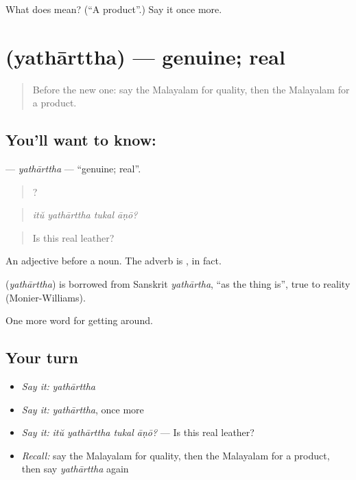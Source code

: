 \begin{tcolorbox}[breakable,colback=teal!4,colframe=teal!35!black,title={Before you move on}]
What does  mean? (\textquotedblleft{}A product\textquotedblright{}.) Say it once more.
\end{tcolorbox}
\section[\texorpdfstring{\ml{യഥാർത്ഥ} (yathārttha)}{യഥാർത്ഥ (yathārttha)}]{ (yathārttha) — genuine; real}

\label{lesson:ML-C492-yatharttha}



\begin{quote}
Before the new one: say the Malayalam for quality, then the Malayalam for a product.
\end{quote}

\subsection*{You'll want to know: }
\textbf{} — \emph{yathārttha} — \textquotedblleft{}genuine; real\textquotedblright{}.

\begin{quote}
   ?
\end{quote}

\begin{quote}
\emph{itŭ yathārttha tukal āṇō?}
\end{quote}

\begin{quote}
Is this real leather?
\end{quote}

An adjective before a noun. The adverb is , in fact.

\begin{cousinweb}
\textbf{} (\emph{yathārttha}) is borrowed from Sanskrit \emph{yathārtha}, \textquotedblleft{}as the thing is\textquotedblright{}, true to reality (Monier-Williams).
\end{cousinweb}

\begin{grammarlens}[title={What you've built}]
One more word for getting around.
\end{grammarlens}

\subsection*{Your turn}
\begin{itemize}
\raggedright
  \item \emph{Say it:} \emph{yathārttha}
  \item \emph{Say it:} \emph{yathārttha}, once more
  \item \emph{Say it:} \emph{itŭ yathārttha tukal āṇō?} — Is this real leather?
  \item \emph{Recall:} say the Malayalam for quality, then the Malayalam for a product, then say \emph{yathārttha} again
\end{itemize}

